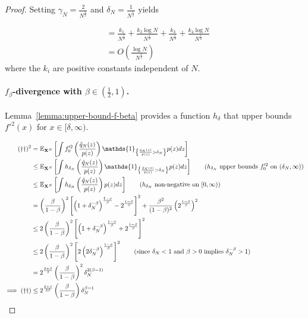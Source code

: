 \begin{proof}
Setting $\gamma_N = \frac{2}{N^\frac{1}{3}}$ and $\delta_N = \frac{1}{N^\frac{1}{3}}$ yields

\begin{align*}
    &= \frac{k_1}{N^{\frac{1}{3}}} + \frac{k_2 \log N}{N^{\frac{1}{3}}}
    + \frac{k_3}{N^{\frac{1}{3}}} 
    + \frac{k_4 \log N}{N^{\frac{1}{2}}} \\
    & = O\left(\frac{\log N}{N^\frac{1}{3}} \right)
\end{align*}
where the $k_i$ are positive constants independent of $N$.

\paragraph{$f_\beta$-divergence with $\beta\in(\frac{1}{2}, 1)$.}
Lemma~\ref{lemma:upper-bound-f-beta} provides a function $h_\delta$ that upper bounds $f'^2(x)$ for $x \in[\delta, \infty)$.

\begin{align*}
    (\dagger\dagger)^2 
    &= \E_{\XN} \left[ \int f_0'^2\left(\frac{\hat{q}_N(z)}{p(z)} \right) \mathds{1}_{\left\lbrace \frac{\hat{q}_N(z)}{p(z)} > \delta_N \right\rbrace} p(z) dz \right]
    \\
    &\leq \E_{\XN} \left[\int h_{\delta_N}\left(\frac{\hat{q}_N(z)}{p(z)} \right) \mathds{1}_{\left\lbrace \frac{\hat{q}_N(z)}{p(z)} > \delta_N \right\rbrace} p(z) dz \right]
    \qquad \text{($h_{\delta_N}$ upper bounds $f_0'^2$ on $(\delta_N, \infty)$)}
    \\
    &\leq \E_{\XN} \left[\int h_{\delta_N}\left(\frac{\hat{q}_N(z)}{p(z)} \right) p(z) dz \right]
    \qquad \text{($h_{\delta_N}$ non-negative on $[0, \infty)$)}
    \\
    &= \left(\frac{\beta}{1-\beta}\right)^2\left[ \left(1+\delta_N^{-\beta}\right)^\frac{1-\beta}{\beta}  - 2^{\frac{1-\beta}{\beta}}\right]^2 + \frac{\beta^2}{(1-\beta)^2}\left(2^{\frac{1-\beta}{\beta}}\right)^2\\
    &\leq 2\left(\frac{\beta}{1-\beta}\right)^2\left[ \left(1+\delta_N^{-\beta}\right)^\frac{1-\beta}{\beta}  + 2^{\frac{1-\beta}{\beta}}\right]^2\\
    &\leq 2\left(\frac{\beta}{1-\beta}\right)^2\left[ 2\left(2\delta_N^{-\beta}\right)^\frac{1-\beta}{\beta}\right]^2 
    \qquad (\text{since $\delta_N<1$ and $\beta>0$ implies $\delta_N^{-\beta} > 1$})\\
    &= 2^{\frac{2+\beta}{\beta}}\left(\frac{\beta}{1-\beta}\right)^2 \delta_N^{2(\beta - 1)}\\
    \implies (\dagger\dagger)&\leq 
    2^{\frac{2+\beta}{2\beta}}\left(\frac{\beta}{1-\beta}\right) \delta_N^{\beta - 1}\\
\end{align*}


\end{proof}
